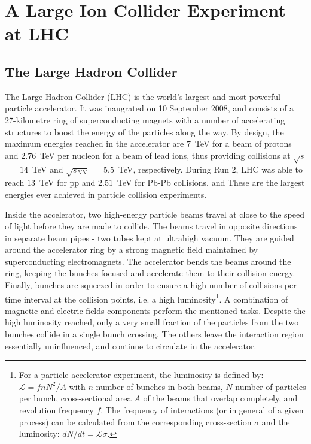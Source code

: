 \chapter{A Large Ion Collider Experiment at LHC}

\label{cap:3}


\vspace*{2cm}
\section{The Large Hadron Collider}
\label{par:3.1}
The Large Hadron Collider (LHC) is the world's largest and most powerful particle accelerator. It was inaugrated on 10 September 2008, and consists of a 27-kilometre ring of superconducting magnets with a number of accelerating structures to boost the energy of the particles along the way. By design, the maximum energies reached in the accelerator are \mbox{$7$ TeV} for a beam of protons and \mbox{$2.76$ TeV} per nucleon for a beam of lead ions, thus providing collisions at \mbox{$\sqrt{s}$ = $14$ TeV} and \mbox{$\sqrt{s_{NN}}$ = $5.5$ TeV}, respectively. During Run 2, LHC was able to reach \mbox{$13$ TeV} for pp and \mbox{$2.51$ TeV} for Pb-Pb collisions. and These are the largest energies ever achieved in particle collision experiments.


Inside the accelerator, two high-energy particle beams travel at close to the speed of light before they are made to collide. The beams travel in opposite directions in separate beam pipes - two tubes kept at ultrahigh vacuum. They are guided around the accelerator ring by a strong magnetic field maintained by superconducting electromagnets. The accelerator bends the beams around the ring, keeping the bunches focused and accelerate them to their collision energy. Finally, bunches are squeezed in order to ensure a high number of collisions per time interval at the collision points, i.e. a high luminosity\footnote{For a particle accelerator experiment, the luminosity is defined by: \mbox{$\mathcal{L} = fnN^{2}/A$} with $n$ number of bunches in both beams, $N$ number of particles per bunch, cross-sectional area $A$ of the beams that overlap completely, and revolution frequency $f$. The frequency of interactions (or in general of a given process) can be calculated from the corresponding cross-section $\sigma$ and the luminosity: \mbox{$dN/dt = \mathcal{L}\sigma$}.}. A combination of magnetic and electric fields components perform the mentioned tasks. Despite the high luminosity reached, only a very small fraction of the particles from the two bunches collide in a single bunch crossing. The others leave the interaction region essentially uninfluenced, and continue to circulate in the accelerator.



